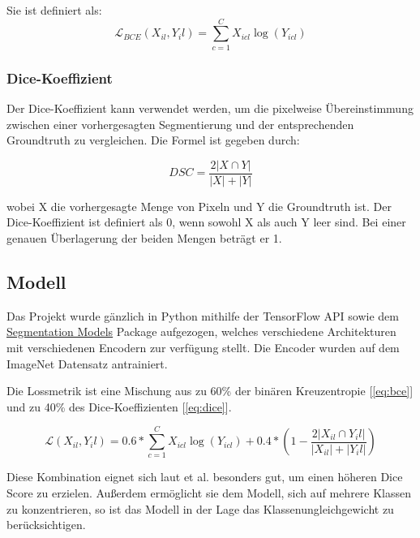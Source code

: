 Sie ist definiert als:
\begin{equation}
\mathcal{L}_{BCE}\left(X_{i l}, Y_{i} l\right)=\sum_{c=1}^{C} X_{i c l} \log \left(Y_{i c l}\right)
\label{eq:bce}
\end{equation}

\subsubsection{Dice-Koeffizient} \label{ssec:dc}

Der Dice-Koeffizient kann verwendet werden, um die pixelweise Übereinstimmung zwischen einer vorhergesagten Segmentierung und der entsprechenden Groundtruth zu vergleichen. Die Formel ist gegeben durch:

\begin{equation}
D S C=\frac{2|X \cap Y|}{|X|+|Y|}
\label{eq:dice}
\end{equation}

wobei X die vorhergesagte Menge von Pixeln und Y die Groundtruth ist. Der Dice-Koeffizient ist definiert als 0, wenn sowohl X als auch Y leer sind. Bei einer genauen Überlagerung der beiden Mengen beträgt er 1. 

\subsection{Modell}

Das Projekt wurde gänzlich in Python mithilfe der TensorFlow API sowie dem
 \href{https://deepai.org/machine-learning-glossary-and-terms/relu}{Segmentation Models} \citet{Yakubovskiy:2019}
 Package aufgezogen, welches verschiedene Architekturen mit verschiedenen Encodern zur verfügung stellt. Die Encoder wurden auf dem ImageNet Datensatz antrainiert.
 
 Die Lossmetrik ist eine Mischung aus zu 60\% der 
binären Kreuzentropie [\ref{eq:bce}] und zu 40\% des Dice-Koeffizienten [\ref{eq:dice}]. 


\begin{equation}
\mathcal{L}\left(X_{i l},{Y_{i}} l\right)= 0.6 * \sum_{c=1}^{C} X_{i c l} \log \left({Y}_{i c l}\right)+0.4 *\left(1-\frac{2\left|X_{i l} \cap {Y_{i}} l\right|}{\left|X_{i l}\right|+\left|{Y_{i}} l\right|}\right)
\label{eq:loss}
\end{equation}

Diese Kombination eignet sich laut \citet{Jadon_2020} et al. besonders gut, um einen höheren Dice Score zu erzielen. Außerdem ermöglicht sie dem Modell, sich auf mehrere Klassen zu konzentrieren, so ist das Modell in der Lage das Klassenungleichgewicht zu berücksichtigen. 

